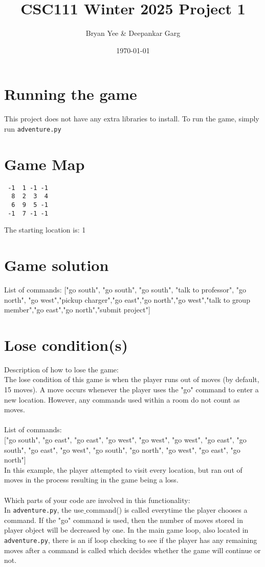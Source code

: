 \documentclass[11pt]{article}
\title{CSC111 Winter 2025 Project 1}
\author{Bryan Yee & Deepankar Garg}
\date{\today}
\begin{document}
\maketitle

\section*{Running the game}
This project does not have any extra libraries to install. To run the game, simply run \texttt{adventure.py}

\section*{Game Map}
\begin{verbatim}
 -1  1 -1 -1 
  8  2  3  4
  6  9  5 -1
 -1  7 -1 -1
\end{verbatim}
The starting location is: 1

\section*{Game solution}
List of commands: ["go south", "go south", "go south", "talk to professor", "go north", "go west","pickup charger","go east","go north","go west","talk to group member","go east","go north","submit project"]

\section*{Lose condition(s)}
Description of how to lose the game:\\
The lose condition of this game is when the player runs out of moves (by default, 15 moves). A move occurs whenever the player uses the "go" command to enter a new location. However, any commands used within a room do not count as moves.
\\\\
List of commands:\\
{["go south", "go east", "go east", "go west", "go west", "go west", "go east", "go south", "go east", "go west", "go south", "go north", "go west", "go east", "go north"]}\\
In this example, the player attempted to visit every location, but ran out of moves in the process resulting in the game being a loss.
\\\\
Which parts of your code are involved in this functionality:\\
In \texttt{adventure.py}, the use$\_$command() is called everytime the player chooses a command. If the "go" command is used, then the number of moves stored in player object will be decreased by one. In the main game loop, also located in \texttt{adventure.py}, there is an if loop checking to see if the player has any remaining moves after a command is called which decides whether the game will continue or not.
\end{document}
